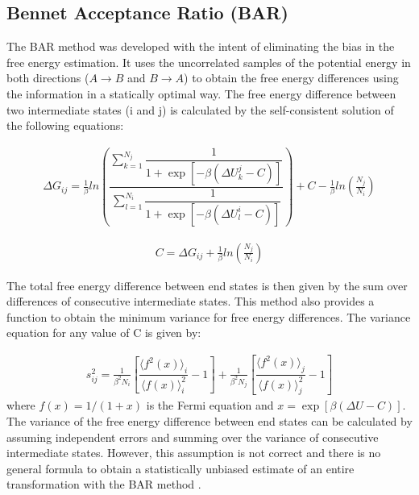 \subsection{Bennet Acceptance Ratio (BAR)}

The BAR method \cite{bennet1976} was developed with the intent of eliminating the bias in the free energy estimation. It uses the uncorrelated samples of the potential energy in both directions ($A \rightarrow B$ and $B \rightarrow A$) to obtain the free energy differences using the information in a statically optimal way. The free energy difference between two intermediate states (i and j) is calculated by the self-consistent solution of the following equations: 

\begin{equation}
\label{eq:bar1}
\begin{aligned}
\Delta G_{ij} = \frac{1}{\beta} ln \left( \dfrac{\sum_{k=1}^{N_{j}} \dfrac{1}{1+\exp[-\beta(\Delta U_{k}^{j}-C)]}}{\sum_{l=1}^{N_{i}} \dfrac{1}{1+\exp[-\beta(\Delta U_{l}^{i}-C)]}}\right) + C - \frac{1}{\beta}ln\left(\frac{N_{j}}{N_{i}}\right)
\end{aligned}
\end{equation}

\begin{equation}
\label{eq:bar2}
\begin{aligned}
C = \Delta G_{ij} + \frac{1}{\beta}ln\left(\frac{N_{j}}{N_{i}}\right)
\end{aligned}
\end{equation}

The total free energy difference between end states is then given by the sum over differences of consecutive intermediate states. This method also provides a function to obtain the minimum variance for free energy differences. The variance equation for any value of C is given by:

\begin{equation}
\label{eq:barvar}
\begin{aligned}
s_{ij}^{2} = \frac{1}{\beta^{2} N_{i}} \left[\dfrac{\langle{f^{2}(x)}\rangle_{i}}{\langle{f(x)}\rangle^{2}_{i}} - 1\right] + \frac{1}{\beta^{2} N_{j}} \left[\dfrac{\langle{f^{2}(x)}\rangle_{j}}{\langle{f(x)}\rangle^{2}_{j}} - 1\right]
\end{aligned}
\end{equation}
where $f(x)=1/(1+x)$ is the Fermi equation and $x=\exp[\beta(\Delta U - C)]$. The variance of the free energy difference between end states can be calculated by assuming independent errors and summing over the variance of consecutive intermediate states. However, this assumption is not correct and there is no general formula to obtain a statistically unbiased estimate of an entire transformation with the BAR method \cite{bareva}. 

